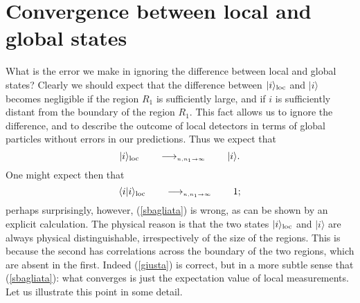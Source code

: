 \documentclass[10pt, nofootinbib]{revtex4}
\newcommand{\be}{\begin{equation}}
\newcommand{\ee}{\end{equation}}
\begin{document}
\section{Convergence between local and global states}

What is the error we make in ignoring the difference between local and
global states?  Clearly we should expect that the difference
between $| i \rangle_{\rm loc}$ and $| i\rangle$ becomes negligible
if the region $R_{1}$ is sufficiently large, and if $i$ is
sufficiently distant from the boundary of the region $R_{1}$.  This
fact allows us to ignore the difference, and to describe the outcome
of local detectors in terms of global particles without errors in our
predictions.  Thus we expect that
%
 \be
| i \rangle_{\rm loc}\hspace{2em} \longrightarrow_{\scriptscriptstyle 
n,n_{1}\to\infty}\hspace{2em}   | i\rangle.
\label{giusta}
 \ee
%
One might expect then that
%
\be
\langle i| i \rangle_{\rm loc}\hspace{2em} 
\longrightarrow_{\scriptscriptstyle 
n,n_{1}\to\infty}\hspace{2em}   1;
\label{sbagliata}
 \ee
%
perhaps surprisingly, however, (\ref{sbagliata}) is wrong, as can be
shown by an explicit calculation.  The physical reason is that the two
states $| i \rangle_{\rm loc}$ and $| i\rangle$ are always physical
distinguishable, irrespectively of the size of the regions.  This is
because the second has correlations across the boundary of the two
regions, which are absent in the first.  Indeed (\ref{giusta}) is
correct, but in a more subtle sense that (\ref{sbagliata}): what
converges is just the expectation value of local measurements.  Let us
illustrate this point in some detail. 
\end{document}
